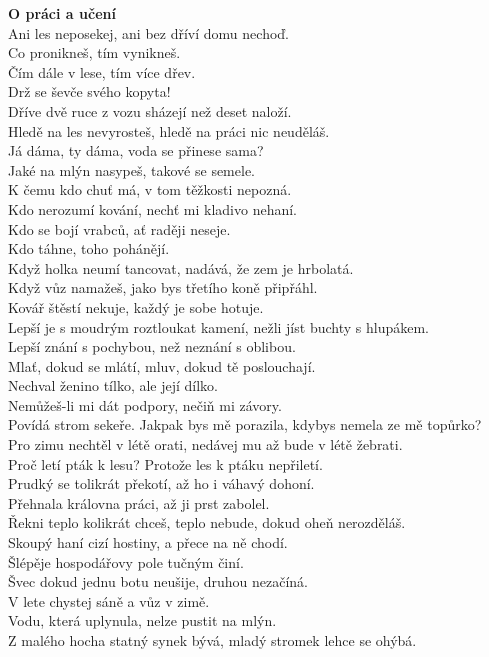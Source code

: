 \begin{multicols}{2}
\noindent
{\large\bf O práci a učení}\\[1 mm]
Ani les neposekej, ani bez dříví domu nechoď.\\
Co pronikneš, tím vynikneš.\\
Čím dále v lese, tím více dřev.\\
Drž se ševče svého kopyta!\\
Dříve dvě ruce z vozu sházejí než deset naloží.\\
Hledě na les nevyrosteš, hledě na práci nic neuděláš.\\
Já dáma, ty dáma, voda se přinese sama?\\
Jaké na mlýn nasypeš, takové se semele.\\
K čemu kdo chuť má, v tom těžkosti nepozná.\\
Kdo nerozumí kování, nechť mi kladivo nehaní.\\
Kdo se bojí vrabců, ať raději neseje.\\
Kdo táhne, toho pohánějí.\\
Když holka neumí tancovat, nadává, že zem je hrbolatá.\\
Když vůz namažeš, jako bys třetího koně připřáhl.\\
Kovář štěstí nekuje, každý je sobe hotuje.\\
Lepší je s moudrým roztloukat kamení, nežli jíst buchty s hlupákem.\\
Lepší znání s pochybou, než neznání s oblibou.\\
Mlať, dokud se mlátí, mluv, dokud tě poslouchají.\\
Nechval ženino tílko, ale její dílko.\\
Nemůžeš-li mi dát podpory, nečiň mi závory.\\
Povídá strom sekeře. Jakpak bys mě porazila, kdybys nemela ze 
mě topůrko?\\
Pro zimu nechtěl v létě orati, nedávej mu až bude v létě žebrati.\\
Proč letí pták k lesu? Protože les k ptáku nepřiletí.\\
Prudký se tolikrát překotí, až ho i váhavý dohoní.\\
Přehnala královna práci, až ji prst zabolel.\\
Řekni teplo kolikrát chceš, teplo nebude, dokud oheň nerozděláš.\\
Skoupý haní cizí hostiny, a přece na ně chodí.\\
Šlépěje hospodářovy pole tučným činí.\\
Švec dokud jednu botu neušije, druhou nezačíná.\\
V lete chystej sáně a vůz v zimě.\\
Vodu, která uplynula, nelze pustit na mlýn.\\
Z malého hocha statný synek bývá, mladý stromek lehce se ohýbá.\\


\end{multicols}
